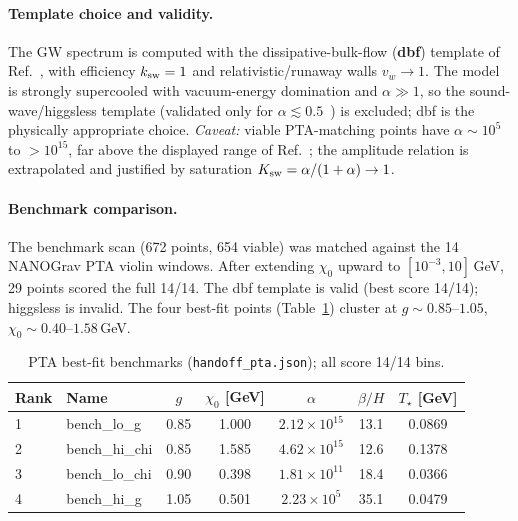\documentclass[11pt]{article}
\newcommand{\chizero}{\chi_0}
\begin{document}
\paragraph{Template choice and validity.}
The GW spectrum is computed with the dissipative-bulk-flow (\textbf{dbf}) template of
Ref.~\cite{LewickiVaskonen2025}, with efficiency $k_{\rm sw}=1$ and relativistic/runaway walls
$v_w\to1$. The model is strongly supercooled with vacuum-energy domination and $\alpha\gg1$, so the
sound-wave/higgsless template (validated only for $\alpha\lesssim0.5$~\cite{Caprini2024Higgsless}) is
excluded; dbf is the physically appropriate choice. \emph{Caveat:} viable PTA-matching points have
$\alpha\sim10^5$ to $>10^{15}$, far above the displayed range of Ref.~\cite{LewickiVaskonen2025}; the
amplitude relation is extrapolated and justified by saturation $K_{\rm sw}=\alpha/(1+\alpha)\to1$.

\paragraph{Benchmark comparison.}
The benchmark scan (672 points, 654 viable) was matched against the 14 NANOGrav PTA violin windows.
After extending $\chizero$ upward to $[10^{-3},10]\,$GeV, 29 points scored the full 14/14. The dbf
template is valid (best score 14/14); higgsless is invalid. The four best-fit points
(Table~\ref{tab:pta}) cluster at $g\sim0.85$--$1.05$, $\chizero\sim0.40$--$1.58\,$GeV.

\begin{table}[h]
\centering
\small
\begin{tabular}{@{}llccccc@{}}
\toprule
Rank & Name & $g$ & $\chizero$ [GeV] & $\alpha$ & $\beta/H$ & $T_\star$ [GeV] \\
\midrule
1 & bench\_lo\_g  & 0.85 & 1.000 & $2.12\!\times\!10^{15}$ & 13.1 & 0.0869 \\
2 & bench\_hi\_chi & 0.85 & 1.585 & $4.62\!\times\!10^{15}$ & 12.6 & 0.1378 \\
3 & bench\_lo\_chi & 0.90 & 0.398 & $1.81\!\times\!10^{11}$ & 18.4 & 0.0366 \\
4 & bench\_hi\_g  & 1.05 & 0.501 & $2.23\!\times\!10^{5}$  & 35.1 & 0.0479 \\
\bottomrule
\end{tabular}
\caption{PTA best-fit benchmarks (\texttt{handoff\_pta.json}); all score 14/14 bins.}
\label{tab:pta}
\end{table}
\end{document}
